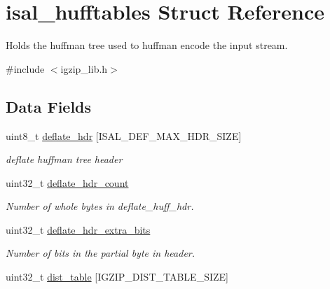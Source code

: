 \hypertarget{structisal__hufftables}{\section{isal\-\_\-hufftables Struct Reference}
\label{structisal__hufftables}
}


Holds the huffman tree used to huffman encode the input stream.  




{\ttfamily \#include $<$igzip\-\_\-lib.\-h$>$}

\subsection*{Data Fields}
\begin{DoxyCompactItemize}
\item 
\hypertarget{structisal__hufftables_a1b087bbe2a68e745de3f3e07f32325d0}{uint8\-\_\-t \hyperlink{structisal__hufftables_a1b087bbe2a68e745de3f3e07f32325d0}{deflate\-\_\-hdr} \mbox{[}I\-S\-A\-L\-\_\-\-D\-E\-F\-\_\-\-M\-A\-X\-\_\-\-H\-D\-R\-\_\-\-S\-I\-Z\-E\mbox{]}}\label{structisal__hufftables_a1b087bbe2a68e745de3f3e07f32325d0}

\begin{DoxyCompactList}\small\item\em deflate huffman tree header \end{DoxyCompactList}\item 
\hypertarget{structisal__hufftables_acb2b9fe9c6f2f9f349653bb4ff1b2ff1}{uint32\-\_\-t \hyperlink{structisal__hufftables_acb2b9fe9c6f2f9f349653bb4ff1b2ff1}{deflate\-\_\-hdr\-\_\-count}}\label{structisal__hufftables_acb2b9fe9c6f2f9f349653bb4ff1b2ff1}

\begin{DoxyCompactList}\small\item\em Number of whole bytes in deflate\-\_\-huff\-\_\-hdr. \end{DoxyCompactList}\item 
\hypertarget{structisal__hufftables_ad0a67b1eba3b08dc4b29881cdb3b7a91}{uint32\-\_\-t \hyperlink{structisal__hufftables_ad0a67b1eba3b08dc4b29881cdb3b7a91}{deflate\-\_\-hdr\-\_\-extra\-\_\-bits}}\label{structisal__hufftables_ad0a67b1eba3b08dc4b29881cdb3b7a91}

\begin{DoxyCompactList}\small\item\em Number of bits in the partial byte in header. \end{DoxyCompactList}\item 
\hypertarget{structisal__hufftables_a31b696f195715ec9fb3a03fcedb3b42c}{uint32\-\_\-t \hyperlink{structisal__hufftables_a31b696f195715ec9fb3a03fcedb3b42c}{dist\-\_\-table} \mbox{[}I\-G\-Z\-I\-P\-\_\-\-D\-I\-S\-T\-\_\-\-T\-A\-B\-L\-E\-\_\-\-S\-I\-Z\-E\mbox{]}}\label{structisal__hufftables_a31b696f195715ec9fb3a03fcedb3b42c}


\end{DoxyCompactItemize}
